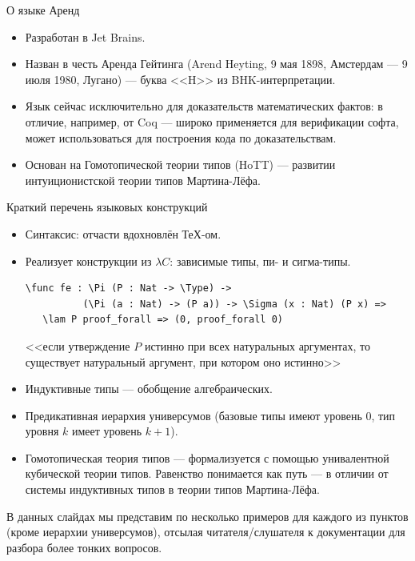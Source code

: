 \documentclass[aspectratio=169]{beamer}
\begin{document}
\begin{frame}{О языке Аренд}
\begin{itemize}
\item Разработан в Jet Brains.
\item Назван в честь Аренда Гейтинга (Arend Heyting, 9 мая 1898, Амстердам — 9 июля 1980, Лугано) --- буква <<H>> из BHK-интерпретации.
\item Язык сейчас исключительно для доказательств математических фактов: в отличие, например, от Coq ---
широко применяется для верификации софта, может использоваться для построения кода по доказательствам.
\item Основан на Гомотопической теории типов (HoTT) --- развитии интуиционистской теории типов Мартина-Лёфа.
\end{itemize}
\end{frame}

\begin{frame}[fragile]{Краткий перечень языковых конструкций}
\begin{itemize}
\item Синтаксис: отчасти вдохновлён ТеХ-ом.
\item Реализует конструкции из $\lambda C$: зависимые типы, пи- и сигма-типы.
\small\color[HTML]{025002}
\begin{verbatim}
\func fe : \Pi (P : Nat -> \Type) -> 
          (\Pi (a : Nat) -> (P a)) -> \Sigma (x : Nat) (P x) =>
   \lam P proof_forall => (0, proof_forall 0)
\end{verbatim}
\normalsize\color{black}
<<если утверждение $P$ истинно при всех натуральных аргументах, то существует натуральный
аргумент, при котором оно истинно>>
\item Индуктивные типы --- обобщение алгебраических.
\item Предикативная иерархия универсумов (базовые типы имеют уровень 0, тип уровня $k$ имеет уровень $k+1$).
\item Гомотопическая теория типов --- формализуется с помощью унивалентной кубической теории типов.
Равенство понимается как путь --- в отличии от системы индуктивных типов в теории типов Мартина-Лёфа.
\end{itemize}
В данных слайдах мы представим по несколько примеров для каждого из пунктов (кроме иерархии универсумов),
отсылая читателя/слушателя к документации для разбора более тонких вопросов.
\end{frame}
\end{document}
